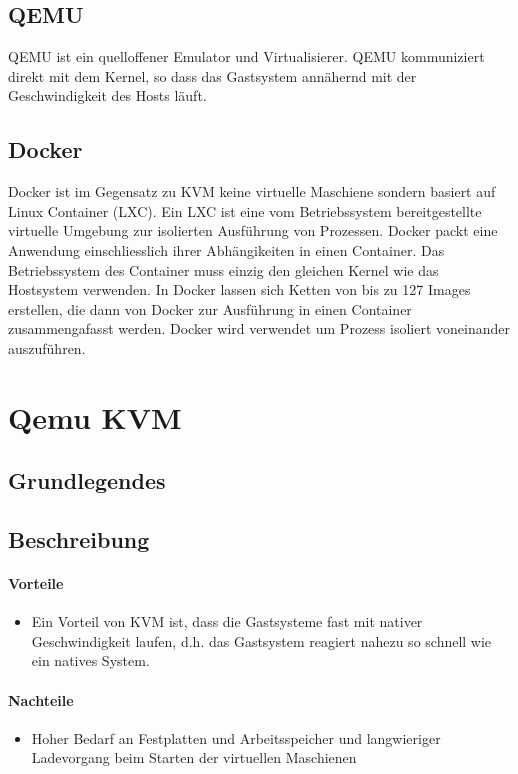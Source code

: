 \subsection{QEMU}
QEMU ist ein quelloffener Emulator und Virtualisierer. QEMU kommuniziert direkt mit dem Kernel, so dass das Gastsystem annähernd mit der Geschwindigkeit des Hosts läuft. 

\subsection{Docker}
Docker ist im Gegensatz zu KVM keine virtuelle Maschiene sondern basiert auf Linux Container (LXC). Ein LXC ist eine vom Betriebssystem bereitgestellte virtuelle Umgebung zur isolierten Ausführung von Prozessen. Docker packt eine Anwendung einschliesslich ihrer Abhängikeiten in einen Container. Das Betriebssystem des Container muss einzig den gleichen Kernel wie das Hostsystem verwenden. In Docker lassen sich Ketten von bis zu 127 Images erstellen, die dann von Docker zur Ausführung in einen Container zusammengafasst werden. Docker wird verwendet um Prozess isoliert voneinander auszuführen. 


\section{Qemu KVM}
\subsection{Grundlegendes}

\subsection{Beschreibung}
\paragraph{Vorteile}
\begin{itemize}
	\item Ein Vorteil von KVM ist, dass die Gastsysteme fast mit nativer Geschwindigkeit laufen, d.h. das Gastsystem reagiert nahezu so schnell wie ein natives System. 
\end{itemize}
\paragraph{Nachteile}
\begin{itemize}
	\item Hoher Bedarf an Festplatten und Arbeitsspeicher und langwieriger Ladevorgang beim Starten der virtuellen Maschienen
\end{itemize}

